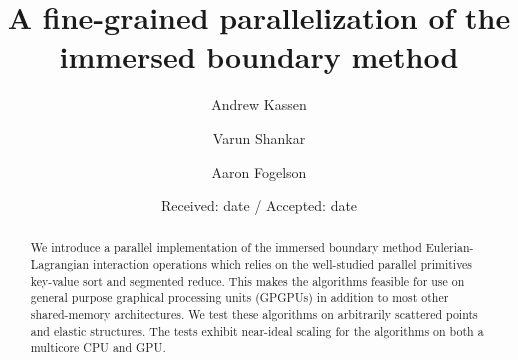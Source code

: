 \newcommand{\thrust}{\texttt{thrust}}
\newcommand{\term}[1]{\textit{#1}}

%


\title{%
    A fine-grained parallelization of the immersed boundary method
}


\author{Andrew Kassen \and Varun Shankar \and Aaron Fogelson}

\authorrunning{}


\date{Received: date / Accepted: date}



\maketitle

\begin{abstract}
We introduce a parallel implementation of the immersed boundary method
Euler\-ian-Lagrangian interaction operations which relies on the well-studied parallel
primitives key-value sort and segmented reduce. This makes the algorithms feasible for
use on general purpose graphical processing units (GPGPUs) in addition to most other
shared-memory architectures. We test these algorithms on arbitrarily scattered points and
elastic structures. The tests exhibit near-ideal scaling for the algorithms on both a
multicore CPU and GPU\@.

\end{abstract}







